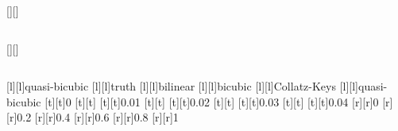 %    
%
%
\begin{psfrags}%
\psfragscanon%
%
[][]{\color[rgb]{0,0,0}\setlength{\tabcolsep}{0pt}\begin{tabular}{c} \end{tabular}}%
[][]{\color[rgb]{0,0,0}\setlength{\tabcolsep}{0pt}\begin{tabular}{c} \end{tabular}}%
[l][l]{\color[rgb]{0,0,0}quasi-bicubic}%
[l][l]{\color[rgb]{0,0,0}truth}%
[l][l]{\color[rgb]{0,0,0}bilinear}%
[l][l]{\color[rgb]{0,0,0}bicubic}%
[l][l]{\color[rgb]{0,0,0}Collatz-Keys}%
[l][l]{\color[rgb]{0,0,0}quasi-bicubic}%
%
[t][t]{0}%
[t][t]{}%
[t][t]{0.01}%
[t][t]{}%
[t][t]{0.02}%
[t][t]{}%
[t][t]{0.03}%
[t][t]{}%
[t][t]{0.04}%
%
[r][r]{0}%
[r][r]{0.2}%
[r][r]{0.4}%
[r][r]{0.6}%
[r][r]{0.8}%
[r][r]{1}%
%
%
\end{psfrags}%
%
